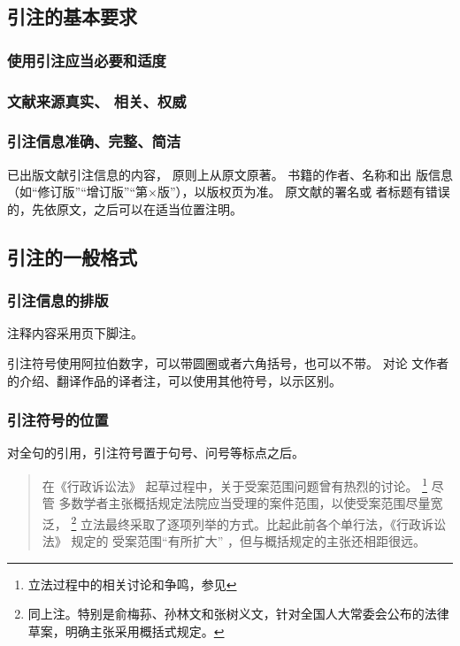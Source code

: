 \documentclass{article}
\begin{document}
\subsection{引注的基本要求}

\subsubsection{使用引注应当必要和适度}

\subsubsection{文献来源真实、 相关、权威}

\subsubsection{引注信息准确、完整、简洁}\label{sec:ssub:postnote}
已出版文献引注信息的内容， 原则上从原文原著。 书籍的作者、名称和出
版信息（如“修订版”“增订版”“第×版”），以版权页为准。 原文献的署名或
者标题有错误的，先依原文，之后可以在适当位置注明。

\begin{quotation}
\end{quotation}


\subsection{引注的一般格式}

\subsubsection{引注信息的排版}
注释内容采用页下脚注。


引注符号使用阿拉伯数字，可以带圆圈或者六角括号，也可以不带。 对论
文作者的介绍、翻译作品的译者注，可以使用其他符号，以示区别。

\subsubsection{引注符号的位置}

对全句的引用，引注符号置于句号、问号等标点之后。 

\begin{quotation}
在《行政诉讼法》 起草过程中，关于受案范围问题曾有热烈的讨论。
\footnote{立法过程中的相关讨论和争鸣，参见}
尽管
多数学者主张概括规定法院应当受理的案件范围，以使受案范围尽量宽泛， 
\footnote{同上注。特别是俞梅荪、孙林文和张树义文，针对全国人大常委会公布的法律草案，明确主张采用概括式规定。}
立法最终采取了逐项列举的方式。比起此前各个单行法，《行政诉讼法》 规定的
受案范围“有所扩大” 
，但与概括规定的主张还相距很远。
\end{quotation}
\end{document}
